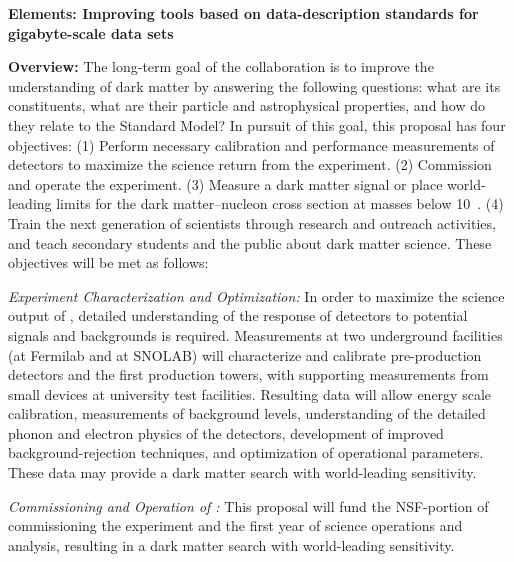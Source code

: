 

\begin{center}
{\large{\bf Elements: Improving tools based on data-description standards for gigabyte-scale data sets}}
\end{center}

{\bf Overview:} The long-term goal of the \scs collaboration is to improve the understanding of dark matter by answering the following questions: what are its constituents, what are their particle and astrophysical properties, and how do they relate to the Standard Model? In pursuit of this goal, this proposal has four objectives:  
(1) Perform necessary calibration and performance measurements of \scs detectors to maximize the science return from the experiment.
(2) Commission and operate the \scs experiment.
(3) Measure a dark matter signal or place world-leading limits for the dark matter--nucleon cross section at masses below 10~\gev.
(4) Train the next generation of scientists through research and outreach activities, and teach secondary students and the public about dark matter science. 
These objectives will be met as follows:


{\it Experiment Characterization and Optimization:} In order to maximize the science output of \scs, detailed understanding of the response of detectors to potential signals and backgrounds is required. Measurements at two underground facilities (\nexus at Fermilab and \cute at SNOLAB) will characterize and calibrate pre-production \scs detectors and the first production \scs towers, with supporting measurements from small devices at university test facilities. Resulting data will allow energy scale calibration, measurements of background levels, understanding of the detailed phonon and electron physics of the detectors, 
development of improved background-rejection techniques,
and optimization of \scs operational parameters. 
These data may provide a dark matter search with world-leading sensitivity. 

{\it Commissioning and Operation of \scs:} This proposal will fund the NSF-portion of commissioning the \scs experiment and the 
first year of science operations and analysis, resulting in a dark matter search with world-leading sensitivity.


